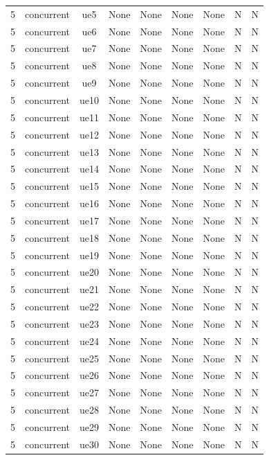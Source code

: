 \begin{table}[ht]
\begin{tabular}{|c|c|c|c|c|c|c|c|c|}
5 & concurrent & ue5 & None & None & None & None & N & N \\
5 & concurrent & ue6 & None & None & None & None & N & N \\
5 & concurrent & ue7 & None & None & None & None & N & N \\
5 & concurrent & ue8 & None & None & None & None & N & N \\
5 & concurrent & ue9 & None & None & None & None & N & N \\
5 & concurrent & ue10 & None & None & None & None & N & N \\
5 & concurrent & ue11 & None & None & None & None & N & N \\
5 & concurrent & ue12 & None & None & None & None & N & N \\
5 & concurrent & ue13 & None & None & None & None & N & N \\
5 & concurrent & ue14 & None & None & None & None & N & N \\
5 & concurrent & ue15 & None & None & None & None & N & N \\
5 & concurrent & ue16 & None & None & None & None & N & N \\
5 & concurrent & ue17 & None & None & None & None & N & N \\
5 & concurrent & ue18 & None & None & None & None & N & N \\
5 & concurrent & ue19 & None & None & None & None & N & N \\
5 & concurrent & ue20 & None & None & None & None & N & N \\
5 & concurrent & ue21 & None & None & None & None & N & N \\
5 & concurrent & ue22 & None & None & None & None & N & N \\
5 & concurrent & ue23 & None & None & None & None & N & N \\
5 & concurrent & ue24 & None & None & None & None & N & N \\
5 & concurrent & ue25 & None & None & None & None & N & N \\
5 & concurrent & ue26 & None & None & None & None & N & N \\
5 & concurrent & ue27 & None & None & None & None & N & N \\
5 & concurrent & ue28 & None & None & None & None & N & N \\
5 & concurrent & ue29 & None & None & None & None & N & N \\
5 & concurrent & ue30 & None & None & None & None & N & N \\

\end{tabular}
\end{table}
